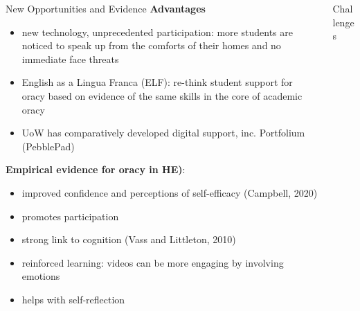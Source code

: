\documentclass[final]{beamer}
\newlength{\onecolwid}
\newlength{\twocolwid}
\begin{document}
\begin{frame}[t]
\begin{columns}[t]
\begin{column}{\twocolwid}
\begin{columns}[t,totalwidth=\twocolwid] %

\begin{column}{\onecolwid} %

\begin{block}{New Opportunities and Evidence}
\textbf{\textcolor{dgreen}{Advantages}}
\begin{itemize}
	\item new technology, unprecedented participation: more students are noticed to speak up from the comforts of their homes and no immediate face threats
	\item English as a Lingua Franca (ELF): re-think student support for oracy based on evidence of the same skills in the core of academic oracy
	\item UoW has comparatively developed digital support, inc. Portfolium (PebblePad)
\end{itemize}
\textbf{\textcolor{dgreen}{Empirical evidence for oracy in HE)}}:
\begin{itemize}
\item improved confidence and perceptions of self-efficacy (Campbell, 2020)
\item promotes participation
\item strong link to cognition (Vass and Littleton, 2010)
\item reinforced learning: videos can be more engaging by involving emotions
\item helps with self-reflection
\end{itemize}



\end{block}


\end{column} %

\begin{column}{\onecolwid} %



\begin{block}{Challenges}


\end{block}
\end{column}
\end{columns}
\end{column}
\end{columns}
\end{frame}
\end{document}

